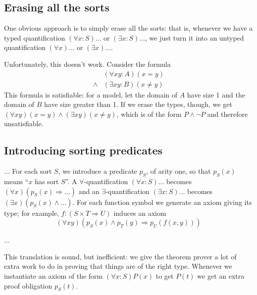 
\subsection{Erasing all the sorts}

One obvious approach is to simply erase all the sorts: that is,
whenever we have a typed quantification $(\forall x:S)\ldots$ or
$(\exists x:S)\ldots$, we just turn it into an untyped quantification
$(\forall x)\ldots$ or $(\exists x)\ldots$.

Unfortunately, this doesn't work. Consider the formula
\begin{align*}
& (\forall x y:A)(x = y) \\
\land & (\exists x y:B)(x \neq y)
\end{align*}
This formula is satisfiable: for a model, let the domain of $A$ have
size 1 and the domain of $B$ have size greater than 1. If we erase the
types, though, we get $(\forall x y)(x = y) \land (\exists x y)(x \neq
y)$, which is of the form $P \land \neg P$ and therefore
unsatisfiable.

\subsection{Introducing sorting predicates}

... For each sort $S$, we introduce a predicate $p_S$, of arity one,
so that $p_S(x)$ means ``$x$ has sort $S$''. A
$\forall$-quantification $(\forall x:S)\ldots$ becomes $(\forall
x)(p_S(x) \Rightarrow \ldots)$ and an $\exists$-quantification
$(\exists x:S)\ldots$ becomes $(\exists x)(p_S(x) \land \ldots)$. For
each function symbol we generate an axiom giving its type; for
example, $f : (S \times T \Rightarrow U)$ induces an axiom
\begin{displaymath}
(\forall x y)(p_S(x) \land p_T(y) \Rightarrow p_U(f(x, y)))
\end{displaymath}

...

This translation is sound, but inefficient: we give the theorem prover
a lot of extra work to do in proving that things are of the right
type. Whenever we instantiate an axiom of the form $(\forall
x:S)P(x)$ to get $P(t)$ we get an extra proof obligation $p_S(t)$.

